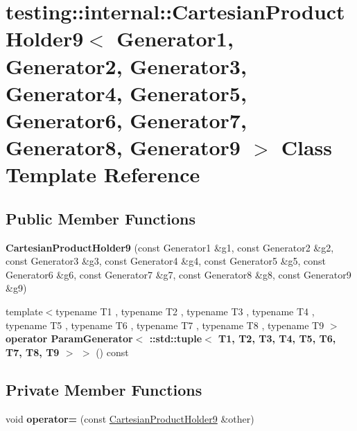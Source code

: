 \hypertarget{classtesting_1_1internal_1_1_cartesian_product_holder9}{}\section{testing\+:\+:internal\+:\+:Cartesian\+Product\+Holder9$<$ Generator1, Generator2, Generator3, Generator4, Generator5, Generator6, Generator7, Generator8, Generator9 $>$ Class Template Reference}
\label{classtesting_1_1internal_1_1_cartesian_product_holder9}
\subsection*{Public Member Functions}
\begin{DoxyCompactItemize}
\item 
\mbox{\label{classtesting_1_1internal_1_1_cartesian_product_holder9_a692a537863ab6adfc4001564887a3bc7}} 
{\bfseries Cartesian\+Product\+Holder9} (const Generator1 \&g1, const Generator2 \&g2, const Generator3 \&g3, const Generator4 \&g4, const Generator5 \&g5, const Generator6 \&g6, const Generator7 \&g7, const Generator8 \&g8, const Generator9 \&g9)
\item 
\mbox{\label{classtesting_1_1internal_1_1_cartesian_product_holder9_aafc7ce193dd88fc179d5a0c58eede7da}} 
{\footnotesize template$<$typename T1 , typename T2 , typename T3 , typename T4 , typename T5 , typename T6 , typename T7 , typename T8 , typename T9 $>$ }\\{\bfseries operator Param\+Generator$<$ \+::std\+::tuple$<$ T1, T2, T3, T4, T5, T6, T7, T8, T9 $>$ $>$} () const
\end{DoxyCompactItemize}
\subsection*{Private Member Functions}
\begin{DoxyCompactItemize}
\item 
\mbox{\label{classtesting_1_1internal_1_1_cartesian_product_holder9_a578342fa80941f8516f292ede0d8f681}} 
void {\bfseries operator=} (const \mbox{\hyperlink{classtesting_1_1internal_1_1_cartesian_product_holder9}{Cartesian\+Product\+Holder9}} \&other)
\end{DoxyCompactItemize}
